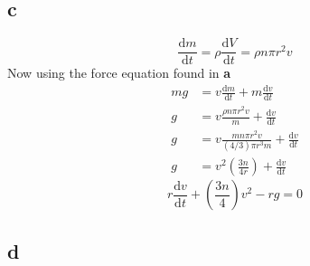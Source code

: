 \documentclass[letter]{article}
\begin{document}
\subsection{c} 
\[
\frac{\mathrm{d} m}{ \mathrm{d} t} = \rho \frac{\mathrm{d} V}{\mathrm{d} t} = \rho n \pi r^2 v
\]
Now using the force equation found in  \textbf{a}
\begin{align*}
	mg &= v \frac{\mathrm{d} m}{\mathrm{d} t} + m \frac{\mathrm{d} v}{\mathrm{d} t}\\
	g &= v \frac{\rho n \pi r^2 v}{m} + \frac{\mathrm{d} v}{\mathrm{d} t} \\
	g &= v \frac{m n \pi r^2 v}{ ( 4 / 3) \pi r^3 m } + \frac{\mathrm{d} v}{\mathrm{d} t} \\
	g &= v^2 \left(\frac{3n}{4r}\right) + \frac{\mathrm{d} v}{\mathrm{d} t} 
\end{align*}
\[
\boxed{
	r \frac{\mathrm{d} v}{\mathrm{d} t} + \left(\frac{3n}{4}\right) v^2 - rg = 0
}
\] 

\subsection*{d}
\end{document}
